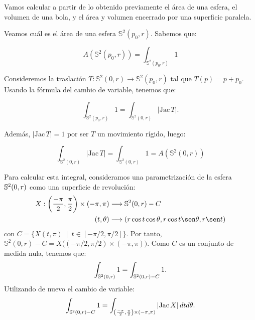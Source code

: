 Vamos calcular a partir de lo obtenido previamente el área de una esfera, el volumen de una bola, y el área y volumen encerrado por una superficie paralela.

\begin{remark}
Veamos cuál es el área de una esfera $\mathbb{S}^2(p_0, r)$. Sabemos que:

\begin{equation*}
    A(\mathbb{S}^2(p_0, r)) = \int_{\mathbb{S}^2(p_0, r)} 1
\end{equation*}

Consideremos la traslación $T: \mathbb{S}^2(0, r) \longrightarrow \mathbb{S}^2(p_0, r)$ tal que $T(p) = p + p_0$. Usando la fórmula del cambio de variable, tenemos que:

\begin{equation*}
    \int_{\mathbb{S}^2(p_0, r)} 1 = \int_{\mathbb{S}^2(0, r)} |\text{Jac} \, T|.
\end{equation*}

Además, $|\text{Jac} \, T|=1$ por ser $T$ un movimiento rígido, luego:

\begin{equation*}
    \int_{\mathbb{S}^2(0, r)} |\text{Jac} \, T| = \int_{\mathbb{S}^2(0, r)} 1 = A(\mathbb{S}^2(0, r))
\end{equation*}

Para calcular esta integral, consideramos una parametrización de la esfera $\mathbb{S}^2 (0,r)$ como una superficie de revolución: 
%
\begin{align*}
    X: \left( \frac{-\pi}{2}, \frac{\pi}{2} \right) \times (-\pi, \pi) &\longrightarrow \mathbb{S}^2(0, r) - C \\
    (t, \theta) &\longrightarrow (r\cos t\cos\theta, r\cos t\sen\theta, r\sen t)
\end{align*}
%
con $C = \{X(t,\pi) \enspace | \enspace t\in [-\pi/2, \pi/2]\}$. Por tanto, $\mathbb{S}^2(0, r) - C = X \big( (-\pi/2, \pi/2) \times (-\pi, \pi) \big)$. Como $C$ es un conjunto de medida nula, tenemos que:
%
\begin{equation*}
    \int_{\mathbb{S}^2(0, r)} 1 = \int_{\mathbb{S}^2(0, r) - C} 1.
\end{equation*}
%
Utilizando de nuevo el cambio de variable:
%
\begin{equation*}
    \int_{\mathbb{S}^2(0, r) - C} 1 = \int_{ \left( \frac{-\pi}{2}, \frac{\pi}{2} \right) \times (-\pi, \pi)} |\text{Jac} \, X| \, dtd\theta.
\end{equation*}


\end{remark}
